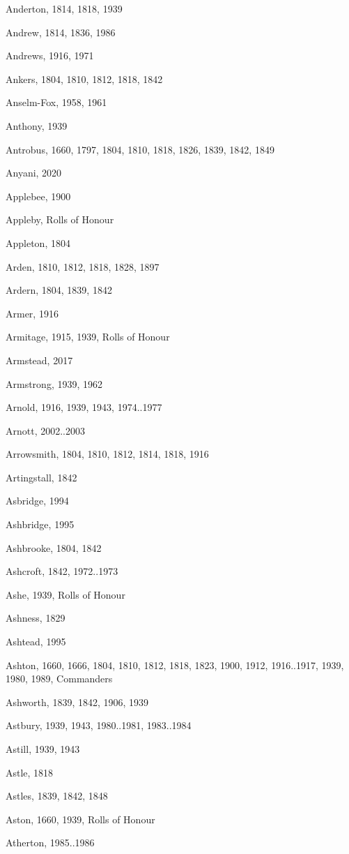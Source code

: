 {\begin{theindex}
\item Anderton, 1814, 1818, 1939
\item Andrew, 1814, 1836, 1986
\item Andrews, 1916, 1971
\item Ankers, 1804, 1810, 1812, 1818, 1842
\item Anselm-Fox, 1958, 1961
\item Anthony, 1939
\item Antrobus, 1660, 1797, 1804, 1810, 1818, 1826, 1839, 1842, 1849
\item Anyani, 2020
\item Applebee, 1900
\item Appleby, Rolls of Honour
\item Appleton, 1804
\item Arden, 1810, 1812, 1818, 1828, 1897
\item Ardern, 1804, 1839, 1842
\item Armer, 1916
\item Armitage, 1915, 1939, Rolls of Honour
\item Armstead, 2017
\item Armstrong, 1939, 1962
\item Arnold, 1916, 1939, 1943, 1974..1977
\item Arnott, 2002..2003
\item Arrowsmith, 1804, 1810, 1812, 1814, 1818, 1916
\item Artingstall, 1842
\item Asbridge, 1994
\item Ashbridge, 1995
\item Ashbrooke, 1804, 1842
\item Ashcroft, 1842, 1972..1973
\item Ashe, 1939, Rolls of Honour
\item Ashness, 1829
\item Ashtead, 1995
\item Ashton, 1660, 1666, 1804, 1810, 1812, 1818, 1823, 1900, 1912, 1916..1917, 1939, 1980, 1989, Commanders
\item Ashworth, 1839, 1842, 1906, 1939
\item Astbury, 1939, 1943, 1980..1981, 1983..1984
\item Astill, 1939, 1943
\item Astle, 1818
\item Astles, 1839, 1842, 1848
\item Aston, 1660, 1939, Rolls of Honour
\item Atherton, 1985..1986

\end{theindex}}
